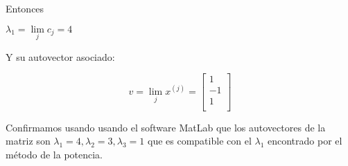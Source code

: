 Entonces 
\begin{center}
$ \lambda_1 = \lim\limits_{j}c_j = 4$
\end{center}
Y su autovector asociado:
\begin{center}
\[ 
v = \lim\limits_{j} x^{(j)}=
    \left[ {\begin{array}{c}
   1 \\
   -1 \\
   1 \\
  \end{array} } \right]
\]
\end{center}

Confirmamos usando usando el software MatLab que los autovectores de la matriz son $\lambda_1 = 4,
\lambda_2 = 3, \lambda_3 = 1$ que es compatible con el $\lambda_1$ encontrado por el método de la
potencia.
